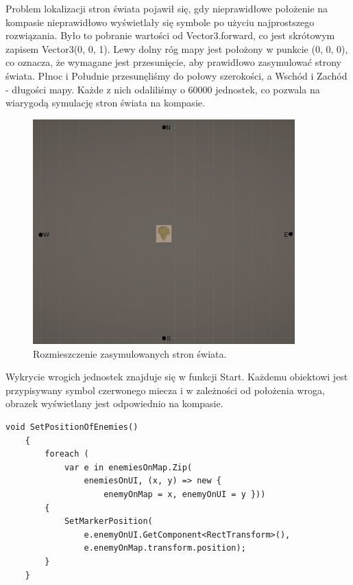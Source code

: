 Problem lokalizacji stron świata pojawił się, gdy nieprawidłowe położenie na kompasie nieprawidłowo wyświetlały się symbole po użyciu najprostszego rozwiązania. Było to pobranie wartości od Vector3.forward, co jest skrótowym zapisem Vector3(0, 0, 1). Lewy dolny róg mapy jest położony w punkcie (0, 0, 0), co oznacza, że wymagane jest przesunięcie, aby prawidłowo zasymulować strony świata. Płnoc i Południe przesunęliśmy do połowy szerokości, a Wschód i Zachód - długości mapy. Każde z nich odaliliśmy o 60000 jednostek, co pozwala na wiarygodą symulację stron świata na kompasie.
\begin{figure}[htbp]
    \centering
    \includegraphics[width=0.9\textwidth]{images/ui/strony_swiata.png}
    \caption{Rozmieszczenie zasymulowanych stron świata.}\label{fig:world_sides}
\end{figure}

Wykrycie wrogich jednostek znajduje się w funkcji Start. Każdemu obiektowi jest przypisywany symbol czerwonego miecza i w zależności od położenia wroga, obrazek wyświetlany jest odpowiednio na kompasie.
\begin{lstlisting}[caption=Fragment kodu odpowiedzialny za połączenie wrogich obiektów na mapie z symbolami wyświetlonymi na kompasie]
    void SetPositionOfEnemies()
    {
        foreach (
            var e in enemiesOnMap.Zip(
                enemiesOnUI, (x, y) => new { 
                    enemyOnMap = x, enemyOnUI = y }))
        {
            SetMarkerPosition(
                e.enemyOnUI.GetComponent<RectTransform>(),
                e.enemyOnMap.transform.position);
        }
    }
\end{lstlisting}